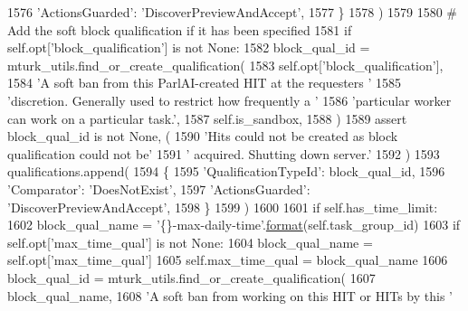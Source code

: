 \begin{DoxyCode}
1576                     \textcolor{stringliteral}{'ActionsGuarded'}: \textcolor{stringliteral}{'DiscoverPreviewAndAccept'},
1577                 \}
1578             )
1579 
1580         \textcolor{comment}{# Add the soft block qualification if it has been specified}
1581         \textcolor{keywordflow}{if} self.opt[\textcolor{stringliteral}{'block\_qualification'}] \textcolor{keywordflow}{is} \textcolor{keywordflow}{not} \textcolor{keywordtype}{None}:
1582             block\_qual\_id = mturk\_utils.find\_or\_create\_qualification(
1583                 self.opt[\textcolor{stringliteral}{'block\_qualification'}],
1584                 \textcolor{stringliteral}{'A soft ban from this ParlAI-created HIT at the requesters '}
1585                 \textcolor{stringliteral}{'discretion. Generally used to restrict how frequently a '}
1586                 \textcolor{stringliteral}{'particular worker can work on a particular task.'},
1587                 self.is\_sandbox,
1588             )
1589             \textcolor{keyword}{assert} block\_qual\_id \textcolor{keywordflow}{is} \textcolor{keywordflow}{not} \textcolor{keywordtype}{None}, (
1590                 \textcolor{stringliteral}{'Hits could not be created as block qualification could not be'}
1591                 \textcolor{stringliteral}{' acquired. Shutting down server.'}
1592             )
1593             qualifications.append(
1594                 \{
1595                     \textcolor{stringliteral}{'QualificationTypeId'}: block\_qual\_id,
1596                     \textcolor{stringliteral}{'Comparator'}: \textcolor{stringliteral}{'DoesNotExist'},
1597                     \textcolor{stringliteral}{'ActionsGuarded'}: \textcolor{stringliteral}{'DiscoverPreviewAndAccept'},
1598                 \}
1599             )
1600 
1601         \textcolor{keywordflow}{if} self.has\_time\_limit:
1602             block\_qual\_name = \textcolor{stringliteral}{'\{\}-max-daily-time'}.\hyperlink{namespaceparlai_1_1chat__service_1_1services_1_1messenger_1_1shared__utils_a32e2e2022b824fbaf80c747160b52a76}{format}(self.task\_group\_id)
1603             \textcolor{keywordflow}{if} self.opt[\textcolor{stringliteral}{'max\_time\_qual'}] \textcolor{keywordflow}{is} \textcolor{keywordflow}{not} \textcolor{keywordtype}{None}:
1604                 block\_qual\_name = self.opt[\textcolor{stringliteral}{'max\_time\_qual'}]
1605             self.max\_time\_qual = block\_qual\_name
1606             block\_qual\_id = mturk\_utils.find\_or\_create\_qualification(
1607                 block\_qual\_name,
1608                 \textcolor{stringliteral}{'A soft ban from working on this HIT or HITs by this '}

\end{DoxyCode}
